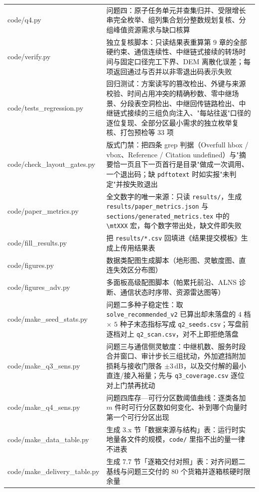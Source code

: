 \begin{xltabular}{0.98\textwidth}{lX}
		code/q4.py & 问题四：原子任务单元并查集归并、受限增长串完全枚举、组列集合划分整数规划复核、分组峰值资源需求与缺口核算 \\
		code/verify.py & 独立复核脚本：只读结果表重算第 9 章的全部硬约束、通信连续性、中继链式接续的转场时间与固定口径完工下界、DEM 离散化误差；每项返回通过与否并以非零退出码表示失败 \\
		code/tests\_regression.py & 回归测试：方案读写的篡改检出、外键与来源校验、时间占用冲突的精确秒数、零中继场景、分段表空洞检出、中继回传链路检出、中继链式接续的三组负向注入、"每站往返"口径的逐位复现、全部分区最小需求的独立枚举复核、打包预检等 33 项 \\
		code/check\_layout\_gates.py & 版式门禁：把四条 grep 判据（Overfull hbox / vbox、Reference / Citation undefined）与"摘要恰一页且下一页首行是目录"做成一次调用、一个退出码；缺 \texttt{pdftotext} 时如实报"未判定"并按失败退出 \\
		code/paper\_metrics.py & 全文数字的唯一来源：只读 \texttt{results/}，生成 \texttt{results/paper\_metrics.json} 与 \texttt{sections/generated\_metrics.tex} 中的 \texttt{\textbackslash mtXXX} 宏，每个数字带出处，缺文件即失败 \\
		code/fill\_results.py & 把 \texttt{results/*.csv} 回填进《结果提交模板》生成上传用结果表 \\
		code/figures.py & 数据类配图生成脚本（地形图、灵敏度图、直连失效区分布图） \\
		code/figures\_adv.py & 多面板高级配图脚本（帕累托前沿、ALNS 诊断、通信状态时序带、资源雷达图等） \\
		code/make\_seed\_stats.py & 问题二多种子稳定性：取 \texttt{solve\_recommended\_v2} 已算出却未落盘的 $4$ 档 $\times$ $5$ 种子末态指标写成 \texttt{q2\_seeds.csv}；写盘前逐档对上 \texttt{q2\_scan.csv}，对不上即拒绝落盘 \\
		code/make\_q3\_sens.py & 问题三与通信侧灵敏度：中继机数、服务时段合并窗口、审计步长三组扰动，外加遮挡附加损耗与接收门限各 $\pm3$\,dB，以及交付解的最小直连/接入裕量；先与 \texttt{q3\_coverage.csv} 逐位对上门禁再扰动 \\
		code/make\_q4\_sens.py & 问题四库存—可行分区数阈值曲线：逐类各加 $m$ 件时可行分区数如何变化、补到哪个向量时第一个可行分区出现 \\
		code/make\_data\_table.py & 生成 3.x 节「数据来源与结构」表：运行时实地量各文件的规模，\texttt{code/} 里指不出的量一律不进表 \\
		code/make\_delivery\_table.py & 生成 7.7 节「逐箱交付对照」表：对齐问题二基线与问题三交付的 80 个货箱并逐箱核硬时限余量 \\

\end{xltabular}
